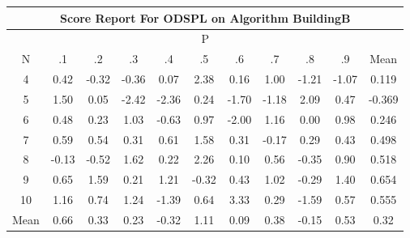 \documentclass[11pt,a4paper]{report}
\begin{document}
\begin{longtable}{ | c || c | c | c | c | c | c | c | c | c || c |}
\hline
\multicolumn{11}{|c|}{ Score Report For ODSPL on Algorithm BuildingB} \\
\hline
\multicolumn{11}{|c|}{ P } \\
\hline
N & .1 & .2 & .3 & .4 & .5 & .6 & .7 & .8 & .9 & Mean\\
 \hline
 \hline
 \endhead
  4 &  \cellcolor[HTML]{F7F7FF} 0.42 &  \cellcolor[HTML]{FFF7F7} -0.32 &  \cellcolor[HTML]{FFF7F7} -0.36 &  \cellcolor[HTML]{FFFFFF} 0.07 &  \cellcolor[HTML]{BFBFFF} 2.38 &  \cellcolor[HTML]{F7F7FF} 0.16 &  \cellcolor[HTML]{E7E7FF} 1.00 &  \cellcolor[HTML]{FFDFDF} -1.21 &  \cellcolor[HTML]{FFE7E7} -1.07 & 0.119 \\
  5 &  \cellcolor[HTML]{D7D7FF} 1.50 &  \cellcolor[HTML]{FFFFFF} 0.05 &  \cellcolor[HTML]{FFBFBF} -2.42 &  \cellcolor[HTML]{FFC7C7} -2.36 &  \cellcolor[HTML]{F7F7FF} 0.24 &  \cellcolor[HTML]{FFD7D7} -1.70 &  \cellcolor[HTML]{FFDFDF} -1.18 &  \cellcolor[HTML]{C7C7FF} 2.09 &  \cellcolor[HTML]{F7F7FF} 0.47 & -0.369 \\
  6 &  \cellcolor[HTML]{EFEFFF} 0.48 &  \cellcolor[HTML]{F7F7FF} 0.23 &  \cellcolor[HTML]{E7E7FF} 1.03 &  \cellcolor[HTML]{FFEFEF} -0.63 &  \cellcolor[HTML]{E7E7FF} 0.97 &  \cellcolor[HTML]{FFCFCF} -2.00 &  \cellcolor[HTML]{DFDFFF} 1.16 &  \cellcolor[HTML]{FFFFFF} 0.00 &  \cellcolor[HTML]{E7E7FF} 0.98 & 0.246 \\
  7 &  \cellcolor[HTML]{EFEFFF} 0.59 &  \cellcolor[HTML]{EFEFFF} 0.54 &  \cellcolor[HTML]{F7F7FF} 0.31 &  \cellcolor[HTML]{EFEFFF} 0.61 &  \cellcolor[HTML]{D7D7FF} 1.58 &  \cellcolor[HTML]{F7F7FF} 0.31 &  \cellcolor[HTML]{FFF7F7} -0.17 &  \cellcolor[HTML]{F7F7FF} 0.29 &  \cellcolor[HTML]{F7F7FF} 0.43 & 0.498 \\
  8 &  \cellcolor[HTML]{FFFFFF} -0.13 &  \cellcolor[HTML]{FFEFEF} -0.52 &  \cellcolor[HTML]{D7D7FF} 1.62 &  \cellcolor[HTML]{F7F7FF} 0.22 &  \cellcolor[HTML]{C7C7FF} 2.26 &  \cellcolor[HTML]{FFFFFF} 0.10 &  \cellcolor[HTML]{EFEFFF} 0.56 &  \cellcolor[HTML]{FFF7F7} -0.35 &  \cellcolor[HTML]{E7E7FF} 0.90 & 0.518 \\
  9 &  \cellcolor[HTML]{EFEFFF} 0.65 &  \cellcolor[HTML]{D7D7FF} 1.59 &  \cellcolor[HTML]{F7F7FF} 0.21 &  \cellcolor[HTML]{DFDFFF} 1.21 &  \cellcolor[HTML]{FFF7F7} -0.32 &  \cellcolor[HTML]{F7F7FF} 0.43 &  \cellcolor[HTML]{E7E7FF} 1.02 &  \cellcolor[HTML]{FFF7F7} -0.29 &  \cellcolor[HTML]{DFDFFF} 1.40 & 0.654 \\
  10 &  \cellcolor[HTML]{DFDFFF} 1.16 &  \cellcolor[HTML]{EFEFFF} 0.74 &  \cellcolor[HTML]{DFDFFF} 1.24 &  \cellcolor[HTML]{FFDFDF} -1.39 &  \cellcolor[HTML]{EFEFFF} 0.64 &  \cellcolor[HTML]{AFAFFF} 3.33 &  \cellcolor[HTML]{F7F7FF} 0.29 &  \cellcolor[HTML]{FFD7D7} -1.59 &  \cellcolor[HTML]{EFEFFF} 0.57 & 0.555 \\
 \hline
 \hline
Mean &  \cellcolor[HTML]{EFEFFF} 0.66 &  \cellcolor[HTML]{F7F7FF} 0.33 &  \cellcolor[HTML]{F7F7FF} 0.23 &  \cellcolor[HTML]{FFF7F7} -0.32 &  \cellcolor[HTML]{E7E7FF} 1.11 &  \cellcolor[HTML]{FFFFFF} 0.09 &  \cellcolor[HTML]{F7F7FF} 0.38 &  \cellcolor[HTML]{FFFFFF} -0.15 &  \cellcolor[HTML]{EFEFFF} 0.53 &  \cellcolor[HTML]{F7F7FF} 0.32
\end{longtable}
\end{document}
